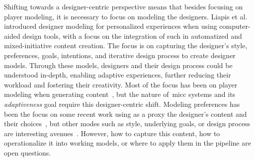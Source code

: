 Shifting towards a designer-centric perspective means that besides focusing on player modeling, it is necessary to focus on modeling the designers. Liapis et al.~\cite{liapis_designer_2013,liapis_designer_2014} introduced designer modeling for personalized experiences when using computer-aided design tools, with a focus on the integration of such in automatized and mixed-initiative content creation. The focus is on capturing the designer's style, preferences, goals, intentions, and iterative design process to create designer models. Through these models, designers and their design process could be understood in-depth, enabling adaptive experiences, further reducing their workload and fostering their creativity. Most of the focus has been on player modeling when generating content~\cite{migkotzidis_susketch_2021,holmgard_automated_2019}, but the nature of~\acrshort{micc} systems and its \emph{adaptiveness} goal require this designer-centric shift. Modeling preferences has been the focus on some recent work using as a proxy the designer's content and their choices~\cite{liapis_adapting_2012,alvarez_learning_2020,halina_threshold_2022}, but other modes such as style, underlying goals, or design process are interesting avenues~\cite{alvarez_designer_2022}. However, how to capture this content, how to operationalize it into working models, or where to apply them in the pipeline are open questions. 




